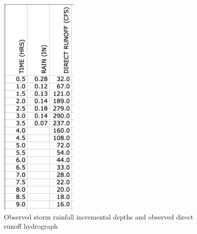 \documentclass[12pt]{article}
\begin{document}
\begin{enumerate}
\begin{figure}[h!] %
   \centering
   \includegraphics[width=1.5in]{RainRunoff1.jpg} 
   \caption{Observed storm rainfall incremental depths and observed direct runoff hydrograph}
   \label{fig:RainRunoff1}
\end{figure}

\end{enumerate}
\end{document}
